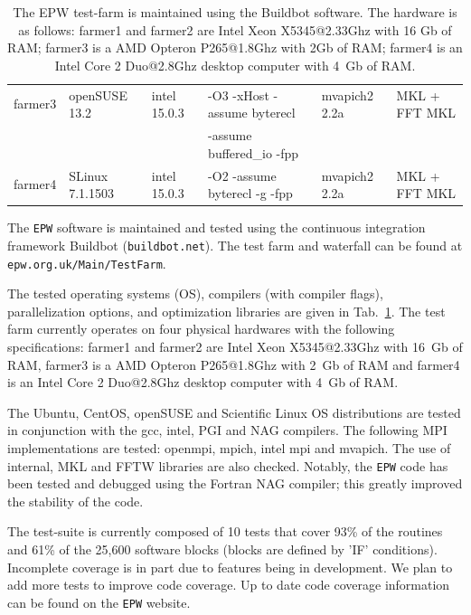 \documentclass[final,3p,times,twocolumn]{elsarticle}
\begin{document}
\begin{table}[t!]
\begin{small}
\begin{center}
\begin{tabular}{c l l l l l }
   farmer3 & openSUSE 13.2   & intel 15.0.3   & -O3 -xHost -assume byterecl & mvapich2 2.2a & MKL + FFT MKL \\
           &                 &                & -assume  buffered\_io -fpp   &                 &                  \\
\rowcolor{Gray} 
   farmer4 & SLinux 7.1.1503 & intel 15.0.3   & -O2 -assume byterecl -g -fpp &  mvapich2 2.2a  &   MKL + FFT MKL    \\           
   \hline
   \end{tabular}
   \caption{ \label{tabtestfarm} The EPW test-farm is maintained using the Buildbot software. The hardware is as follows: farmer1 and farmer2 are Intel Xeon X5345@2.33Ghz with 16 Gb of RAM; farmer3 is a AMD Opteron P265@1.8Ghz with 2Gb of RAM; farmer4 is an Intel Core 2 Duo@2.8Ghz desktop computer with 4~Gb of RAM.}
 \end{center}
 \end{small}
\end{table}



The \texttt{EPW} software is maintained and tested using the continuous integration framework Buildbot (\texttt{buildbot.net}). The test farm and waterfall can be found at \texttt{epw.org.uk/Main/TestFarm}. 

The tested operating systems (OS), compilers (with compiler flags), parallelization options, and optimization libraries are given in Tab.~\ref{tabtestfarm}.
The test farm currently operates on four physical hardwares with the following specifications: farmer1 and farmer2 are Intel Xeon X5345@2.33Ghz with 16~Gb of RAM, farmer3 is a AMD Opteron P265@1.8Ghz with 2~Gb of RAM and farmer4 is an Intel Core 2 Duo@2.8Ghz desktop computer with 4~Gb of RAM.  

The Ubuntu, CentOS, openSUSE and Scientific Linux OS distributions are tested in conjunction with the gcc, intel, PGI and NAG compilers. The following MPI implementations are tested: openmpi, mpich, intel mpi and mvapich. The use of internal, MKL and FFTW libraries are also checked.  
Notably, the \texttt{EPW} code has been tested and debugged using the Fortran NAG compiler; this greatly improved the stability of the code. 

The test-suite is currently composed of 10 tests that cover 93\% of the routines and 61\% of the 25,600 software blocks (blocks are defined by 'IF' conditions). Incomplete coverage is in part due to features being in development. We plan to add more tests to improve code coverage. Up to date code coverage information can be found on the \texttt{EPW} website.   
\end{document}
